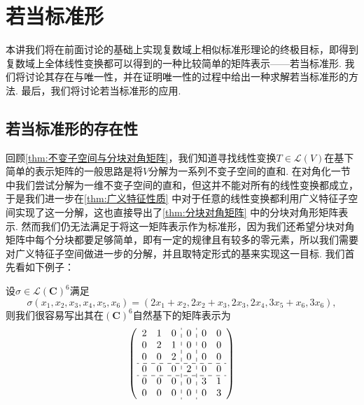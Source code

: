 \chapter{若当标准形}

本讲我们将在前面讨论的基础上实现复数域上相似标准形理论的终极目标，即得到复数域上全体线性变换都可以得到的一种比较简单的矩阵表示——若当标准形. 我们将讨论其存在与唯一性，并在证明唯一性的过程中给出一种求解若当标准形的方法. 最后，我们将讨论若当标准形的应用.

\section{若当标准形的存在性}
回顾\autoref{thm:不变子空间与分块对角矩阵}，我们知道寻找线性变换$T\in\mathcal{L}(V)$在基下简单的表示矩阵的一般思路是将$V$分解为一系列不变子空间的直和. 在对角化一节中我们尝试分解为一维不变子空间的直和，但这并不能对所有的线性变换都成立，于是我们进一步在\autoref{thm:广义特征性质} 中对于任意的线性变换都利用广义特征子空间实现了这一分解，这也直接导出了\autoref{thm:分块对角矩阵} 中的分块对角形矩阵表示. 然而我们仍无法满足于将这一矩阵表示作为标准形，因为我们还希望分块对角矩阵中每个分块都要足够简单，即有一定的规律且有较多的零元素，所以我们需要对广义特征子空间做进一步的分解，并且取特定形式的基来实现这一目标. 我们首先看如下例子：

\begin{example}{}{}
    设$\sigma\in\mathcal{L}(\mathbf{C})^6$满足
    \[\sigma(x_1,x_2,x_3,x_4,x_5,x_6)=(2x_1+x_2,2x_2+x_3,2x_3,2x_4,3x_5+x_6,3x_6),\]
    则我们很容易写出其在$(\mathbf{C})^6$自然基下的矩阵表示为
    \[\left(\begin{array}{ccc:c:cc}
                2 & 1 & 0 & 0 & 0 & 0 \\
                0 & 2 & 1 & 0 & 0 & 0 \\
                0 & 0 & 2 & 0 & 0 & 0 \\
                \hdashline
                0 & 0 & 0 & 2 & 0 & 0 \\
                \hdashline
                0 & 0 & 0 & 0 & 3 & 1 \\
                0 & 0 & 0 & 0 & 0 & 3 \\
            \end{array}\right)\]
\end{example}

